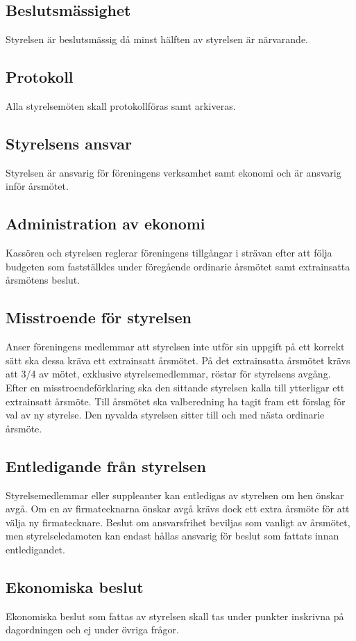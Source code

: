 \documentclass[11pt,a4paper]{article}
\begin{document}
\subsection{Beslutsmässighet}
Styrelsen är beslutsmässig då minst hälften av styrelsen är närvarande.
\subsection{Protokoll}
Alla styrelsemöten skall protokollföras samt arkiveras. 
\subsection{Styrelsens ansvar}
Styrelsen är ansvarig för  föreningens verksamhet samt ekonomi och är ansvarig inför årsmötet.
\subsection{Administration av ekonomi}
Kassören och styrelsen reglerar föreningens tillgångar i strävan efter att
följa budgeten som fastställdes under föregående ordinarie årsmötet samt
extrainsatta årsmötens beslut.
\subsection{Misstroende för styrelsen}
Anser föreningens medlemmar att
styrelsen inte utför sin uppgift på ett korrekt sätt ska dessa kräva ett
extrainsatt årsmötet. På det extrainsatta årsmötet krävs att 3/4 av mötet,
exklusive styrelsemedlemmar, röstar för styrelsens avgång.
Efter en misstroendeförklaring ska den sittande styrelsen kalla till
ytterligar ett extrainsatt årsmöte. Till årsmötet ska valberedning ha tagit
fram ett förslag för val av ny styrelse. Den nyvalda
styrelsen sitter till och med nästa ordinarie årsmöte.
\subsection{Entledigande från styrelsen}
Styrelsemedlemmar eller suppleanter kan entledigas av styrelsen om hen önskar avgå. Om
en av firmatecknarna önskar avgå krävs dock ett extra årsmöte för att
välja ny firmatecknare. Beslut om ansvarsfrihet beviljas som vanligt av
årsmötet, men styrelseledamoten kan endast hållas ansvarig för beslut
som fattats innan entledigandet.
\subsection{Ekonomiska beslut}
Ekonomiska beslut som fattas av styrelsen skall tas under punkter
inskrivna på dagordningen och ej under övriga frågor.
\end{document}
